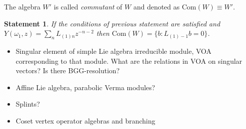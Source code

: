 \documentclass[12pt]{article}
\newtheorem{statement}{Statement}
\begin{document}
The algebra  $W'$ is called {\it commutant} of $W$ and denoted as $\mathrm{Com}(W)\equiv W'$.
\begin{statement}
  If the conditions of previous statement are satisfied and  $Y(\omega_1,z)=\sum_n
  L_{(1)n} z^{-n-2}$ then $\mathrm{Com}(W)=\{b: L_{(1)-1}b=0\}$. 
\end{statement}


\begin{itemize}
\item Singular element of simple Lie algebra irreducible module, VOA corresponding to that module.
  What are the relations in VOA on singular vectors? Is there BGG-resolution?
\item Affine Lie algebra, parabolic Verma modules?
\item Splints?
\item Coset vertex operator algebras and branching
\end{itemize}


{}

\end{document}
